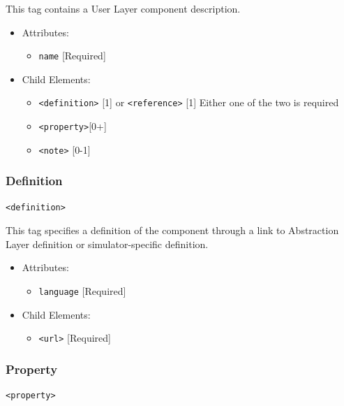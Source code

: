 \documentclass[draftspec]{ninemlspec}
\begin{document}
This tag contains a User Layer component description.

\begin{itemize}
\item Attributes:
%
\begin{itemize}
\item \verb|name| {[}Required{]}
\end{itemize}

\item Child Elements:
%
\begin{itemize}
\item \verb|<definition>| {[}1{]} or \verb|<reference>| {[}1{]} Either one
of the two is required
\item \verb|<property>|{[}0+{]}
\item \verb|<note>| {[}0-1{]}
\end{itemize}

\end{itemize}

\subsubsection{Definition}
%
\begin{lstlisting}
<definition>
\end{lstlisting}

This tag specifies a definition of the component through a link to Abstraction
Layer definition or simulator-specific definition.

\begin{itemize}
\item Attributes:
%
\begin{itemize}
\item \verb|language| {[}Required{]}
\end{itemize}

\item Child Elements:
%
\begin{itemize}
\item \verb|<url>| {[}Required{]}
\end{itemize}

\end{itemize}

\subsubsection{Property}
%
\begin{lstlisting}
<property>
\end{lstlisting}
\end{document}
